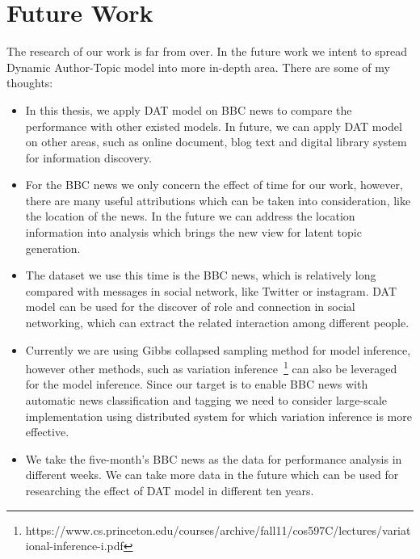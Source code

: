 \section{Future Work}
The research of our work is far from over. In the future work we intent to spread Dynamic Author-Topic model into more in-depth area. There are some of my thoughts:
\begin{itemize}
    \item In this thesis, we apply DAT model on BBC news to compare the performance with other existed models. In future, we can apply DAT model on other areas, such as online document, blog text and digital library system for information discovery. 
    \item For the BBC news we only concern the effect of time for our work, however, there are many useful attributions which can be taken into consideration, like the location of the news. In the future we can address the location information into analysis which brings the new view for latent topic generation.
    \item The dataset we use this time is the BBC news, which is relatively long compared with messages in social network, like Twitter or instagram. DAT model can be used for the discover of role and connection in social networking, which can extract the related interaction among different people.
    \item Currently we are using Gibbs collapsed sampling method for model inference, however other methods, such as variation inference~\footnote{https://www.cs.princeton.edu/courses/archive/fall11/cos597C/lectures/variational-inference-i.pdf} can also be leveraged for the model inference. Since our target is to enable BBC news with automatic news classification and tagging we need to consider large-scale implementation using distributed system for which variation inference is more effective. 
    \item We take the five-month's BBC news as the data for performance analysis in different weeks. We can take more data in the future which can be used for researching the effect of DAT model in different ten years.
\end{itemize}
